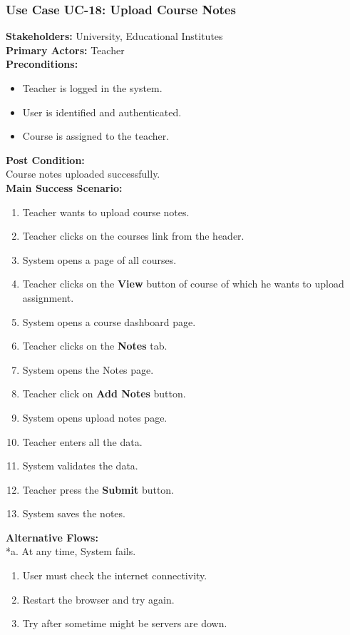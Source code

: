 \documentclass[12pt]{article}
\begin{document}
\subsubsection{Use Case UC-18: Upload Course Notes}
\textbf{Stakeholders: } University, Educational Institutes \\
\textbf{Primary Actors: }Teacher \\
\newpage
\textbf{Preconditions:}
\begin{itemize}
\item Teacher is logged in the system.
\item User is identified and authenticated.
\item Course is assigned to the teacher.
\end{itemize}
\textbf{Post Condition: }\\
Course notes uploaded successfully.\\
\textbf{Main Success Scenario:}
\begin{enumerate}
\item Teacher wants to upload course notes.
\item Teacher clicks on the courses link from the header.
\item System opens a page of all courses.
\item Teacher clicks on the \textbf{View} button of course of which he wants to upload assignment.
\item System opens a course dashboard page.
\item Teacher clicks on the \textbf{Notes} tab.
\item System opens the Notes page.
\item Teacher click on \textbf{Add Notes} button.
\item System opens upload notes page.
\item Teacher enters all the data.
\item System validates the data.
\item Teacher press the \textbf{Submit} button.
\item System saves the notes.
\end{enumerate}
\newpage
\textbf{Alternative Flows:}\\
*a. At any time, System fails.
\begin{enumerate}
\item User must check the internet connectivity.
\item Restart the browser and try again.
\item Try after sometime might be servers are down.
\end{enumerate}
\end{document}
